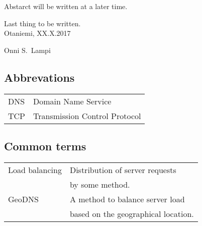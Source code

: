 \documentclass[english,12pt,a4paper,pdftex,elec,utf8]{aaltothesis}
\begin{document}
\newpage
%
\begin{abstractpage}[english]
Abstarct will be written at a later time.
\end{abstractpage}
%
%

Last thing to be written.\\

\vspace{5cm}
Otaniemi, XX.X.2017

\vspace{5mm}
{\hfill Onni S.\ Lampi \hspace{1cm}}

\newpage


\thesistableofcontents



\subsection*{Abbrevations}

\begin{tabular}{ll}
    DNS & Domain Name Service \\
    TCP & Transmission Control Protocol\\
\end{tabular}
\subsection*{Common terms}

\begin{tabular}{ll}
    Load balancing & Distribution of server requests\\
                  & by some method.\\
    GeoDNS        & A method to balance server load\\
                  & based on the geographical location.
\end{tabular}
\end{document}
